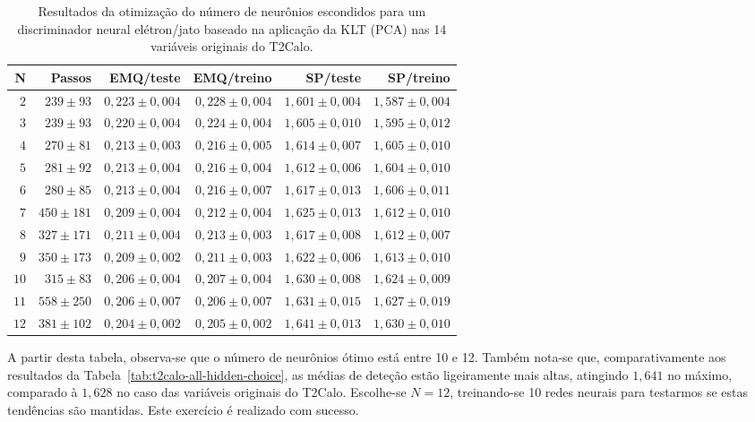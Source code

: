 \begin{table}
\caption{Resultados da otimização do número de neurônios escondidos para um
discriminador neural elétron/jato baseado na aplicação da KLT (PCA) nas 14
variáveis originais do T2Calo.}
\label{tab:t2calo-all-pca-choice}
\begin{center}
\begin{tabular}{|r|r|r|r|r|r|} \hline
N & Passos & EMQ/teste & EMQ/treino & SP/teste & SP/treino \\ \hline 
$2$ & $239\pm93$ & $0,223\pm0,004$ & $0,228\pm0,004$ & $1,601\pm0,004$ & $1,587\pm0,004$ \\
$3$ & $239\pm93$ & $0,220\pm0,004$ & $0,224\pm0,004$ & $1,605\pm0,010$ & $1,595\pm0,012$ \\
$4$ & $270\pm81$ & $0,213\pm0,003$ & $0,216\pm0,005$ & $1,614\pm0,007$ & $1,605\pm0,010$ \\
$5$ & $281\pm92$ & $0,213\pm0,004$ & $0,216\pm0,004$ & $1,612\pm0,006$ & $1,604\pm0,010$ \\
$6$ & $280\pm85$ & $0,213\pm0,004$ & $0,216\pm0,007$ & $1,617\pm0,013$ & $1,606\pm0,011$ \\
$7$ & $450\pm181$ & $0,209\pm0,004$ & $0,212\pm0,004$ & $1,625\pm0,013$ & $1,612\pm0,010$ \\
$8$ & $327\pm171$ & $0,211\pm0,004$ & $0,213\pm0,003$ & $1,617\pm0,008$ & $1,612\pm0,007$ \\
$9$ & $350\pm173$ & $0,209\pm0,002$ & $0,211\pm0,003$ & $1,622\pm0,006$ & $1,613\pm0,010$ \\
$10$ & $315\pm83$ & $0,206\pm0,004$ & $0,207\pm0,004$ & $1,630\pm0,008$ & $1,624\pm0,009$ \\
$11$ & $558\pm250$ & $0,206\pm0,007$ & $0,206\pm0,007$ & $1,631\pm0,015$ & $1,627\pm0,019$ \\
$12$ & $381\pm102$ & $0,204\pm0,002$ & $0,205\pm0,002$ & $1,641\pm0,013$ & $1,630\pm0,010$ \\
\hline
\end{tabular}
\end{center}
\end{table}

A partir desta tabela, observa-se que o número de neurônios ótimo está entre 10
e 12. Também nota-se que, comparativamente aos resultados da
Tabela~\ref{tab:t2calo-all-hidden-choice}, as médias de deteção estão
ligeiramente mais altas, atingindo $1,641$ no máximo, comparado à $1,628$ no
caso das variáveis originais do T2Calo. Escolhe-se $N=12$, treinando-se 10
redes neurais para testarmos se estas tendências são mantidas. Este exercício
é realizado com sucesso.

